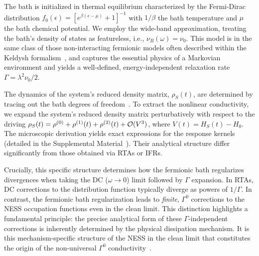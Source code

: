 \documentclass[twocolumn, prx, reprint, amsfonts, amsmath, amssymb, longbibliography, floatfix, aps]{revtex4-2}
\begin{document}
The bath is initialized in thermal equilibrium characterized by the Fermi-Dirac distribution $f_0(\epsilon) = [e^{\beta(\epsilon-\mu)}+1]^{-1}$ with $1/\beta$ the bath temperature and $\mu$ the bath chemical potential. 
We employ the wide-band approximation, treating the bath's density of states as featureless, i.e., $\nu_B(\omega)=\nu_0$.
This model is in the same class of those non-interacting fermionic models often described within the Keldysh formalism~\cite{gerchikov1989theory,jauho1994time,johnsen1999quasienergy,kohler2005driven,kamenev2011field,nagaosa2017concept,matsyshyn2021rabi}, and captures the essential physics of a Markovian environment and yields a well-defined, energy-independent relaxation rate $\Gamma = \lambda^2 \nu_0/2$.

The dynamics of the system's reduced density matrix, $\rho_S(t)$, are determined by tracing out the bath degrees of freedom~\cite{shi2023berry,shi2024floquet}. 
To extract the nonlinear conductivity, we expand the system's reduced density matrix perturbatively with respect to the driving $\rho_S(t) = \rho^{(0)} + \rho^{(1)}(t) + \rho^{(2)}(t) + {\cal O}(V^3)$, where $V(t) = H_S(t) - H_0$.
The microscopic derivation yields exact expressions for the response kernels (detailed in the Supplemental Material~\cite{supplemental}). 
Their analytical structure differ significantly from those obtained via RTAs or IFRs.

Crucially, this specific structure determines how the fermionic bath regularizes divergences when taking the DC ($\omega \to 0$) limit followed by $\Gamma$ expansion. 
In RTAs, DC corrections to the distribution function typically diverge as powers of $1/\Gamma$. 
In contrast, the fermionic bath regularization leads to \textit{finite}, $\Gamma^0$ corrections to the NESS occupation functions even in the clean limit.
This distinction highlights a fundamental principle: the precise analytical form of these $\Gamma$-independent corrections is inherently determined by the physical dissipation mechanism. 
It is this mechanism-specific structure of the NESS in the clean limit that constitutes the origin of the non-universal $\Gamma^0$ conductivity~\cite{shi2024floquet,shi2025ultracritical}.

\medskip
\end{document}
